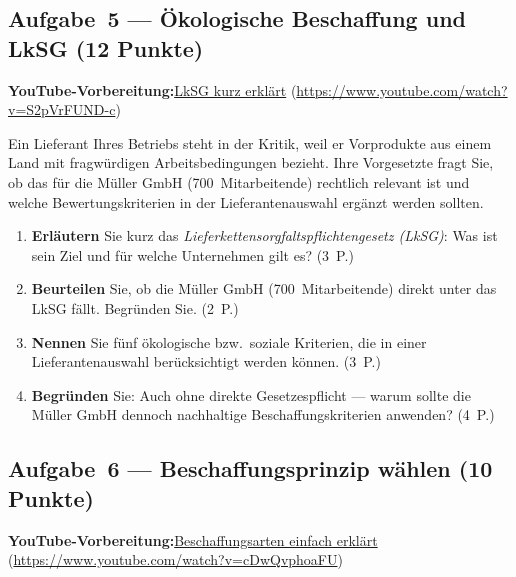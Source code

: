 \documentclass[11pt, a4paper]{article}
\begin{document}
\subsection*{Aufgabe~5 --- Ökologische Beschaffung und LkSG (12 Punkte)}

\noindent\textbf{\color{bfwAccent}YouTube-Vorbereitung:}\enspace \href{https://www.youtube.com/watch?v=S2pVrFUND-c}{LkSG kurz erklärt} (\url{https://www.youtube.com/watch?v=S2pVrFUND-c})

\medskip
Ein Lieferant Ihres Betriebs steht in der Kritik, weil er Vorprodukte aus einem Land
mit fragwürdigen Arbeitsbedingungen bezieht. Ihre Vorgesetzte fragt Sie, ob das für die
Müller GmbH (700~Mitarbeitende) rechtlich relevant ist und welche Bewertungs\-kriterien
in der Lieferantenauswahl ergänzt werden sollten.

\begin{enumerate}[label=(\alph*)]
  \item \textbf{Erläutern} Sie kurz das \emph{Lieferketten\-sorgfalts\-pflichten\-gesetz (LkSG)}: Was ist sein Ziel und für welche Unternehmen gilt es? \hfill (3~P.)
  \item \textbf{Beurteilen} Sie, ob die Müller GmbH (700~Mitarbeitende) direkt unter das LkSG fällt. Begründen Sie. \hfill (2~P.)
  \item \textbf{Nennen} Sie fünf ökologische bzw.\ soziale Kriterien, die in einer Lieferantenauswahl berücksichtigt werden können. \hfill (3~P.)
  \item \textbf{Begründen} Sie: Auch ohne direkte Gesetzespflicht --- warum sollte die Müller GmbH dennoch nachhaltige Beschaffungs\-kriterien anwenden? \hfill (4~P.)
\end{enumerate}

\subsection*{Aufgabe~6 --- Beschaffungsprinzip wählen (10 Punkte)}

\noindent\textbf{\color{bfwAccent}YouTube-Vorbereitung:}\enspace \href{https://www.youtube.com/watch?v=cDwQvphoaFU}{Beschaffungsarten einfach erklärt} (\url{https://www.youtube.com/watch?v=cDwQvphoaFU})
\end{document}
